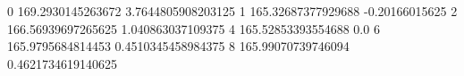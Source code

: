 0 169.2930145263672 3.7644805908203125
1 165.32687377929688 -0.20166015625
2 166.56939697265625 1.040863037109375
4 165.52853393554688 0.0
6 165.9795684814453 0.4510345458984375
8 165.99070739746094 0.4621734619140625
